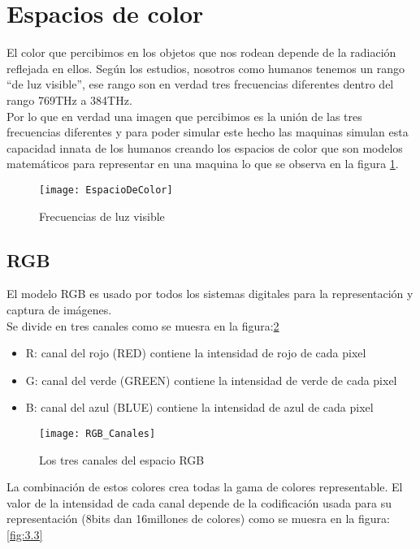 
\section{Espacios de color }
El color que percibimos en los objetos que nos rodean depende de la radiación reflejada en ellos. Según los estudios, nosotros como humanos tenemos un rango ``de luz visible'', ese rango son en verdad tres frecuencias diferentes dentro del rango 769THz a 384THz\cite{Manual:HAE}.\\
Por lo que en verdad una imagen que percibimos es la unión de las tres frecuencias diferentes y para poder simular este hecho las maquinas simulan esta capacidad innata de los humanos creando los espacios de color que son modelos matemáticos para representar en una maquina lo que se observa en la figura \ref{fig:3.1}.

\begin{figure}[h]
\centering
\texttt{[image: EspacioDeColor]}
\caption{Frecuencias de luz visible \cite{Manual:HAE}}
\label{fig:3.1}
\end{figure}

\subsection{RGB}
El modelo RGB es usado por todos los sistemas digitales para la representación y captura de imágenes.\\
Se divide en tres canales como se muesra en la figura:\ref{fig:3.2}\\
\begin{itemize}
	\item R: canal del rojo (RED) contiene la intensidad de rojo de cada pixel\\
	\item G: canal del verde (GREEN) contiene la intensidad de verde de cada pixel\\
	\item B: canal del azul (BLUE) contiene la intensidad de azul de cada pixel\\ 
\end{itemize}

\begin{figure}[h]
\centering
\texttt{[image: RGB\_Canales]}
\caption{Los tres canales del espacio RGB \cite{Manual:HAE}}
\label{fig:3.2}
\end{figure}
La combinación de estos colores crea todas la gama de colores representable.
El valor de la intensidad de cada canal depende de la codificación usada para su representación (8bits dan 16millones de colores) como se muesra en la figura:\ref{fig:3.3}

